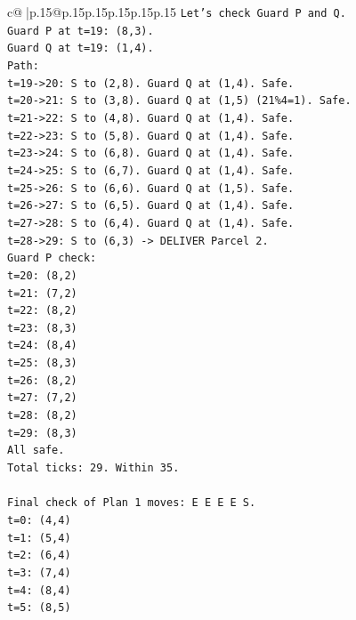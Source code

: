 \documentclass{article}
\begin{document}
{\begin{supertabular}{c@{$\;$}|p{.15\linewidth}@{}p{.15\linewidth}p{.15\linewidth}p{.15\linewidth}p{.15\linewidth}p{.15\linewidth}}
{{{\texttt{Let's check Guard P and Q.} \\
\texttt{Guard P at t=19: (8,3).} \\
\texttt{Guard Q at t=19: (1,4).} \\
\texttt{Path:} \\
\texttt{t=19{-}>20: S to (2,8). Guard Q at (1,4). Safe.} \\
\texttt{t=20{-}>21: S to (3,8). Guard Q at (1,5) (21\%4=1). Safe.} \\
\texttt{t=21{-}>22: S to (4,8). Guard Q at (1,4). Safe.} \\
\texttt{t=22{-}>23: S to (5,8). Guard Q at (1,4). Safe.} \\
\texttt{t=23{-}>24: S to (6,8). Guard Q at (1,4). Safe.} \\
\texttt{t=24{-}>25: S to (6,7). Guard Q at (1,4). Safe.} \\
\texttt{t=25{-}>26: S to (6,6). Guard Q at (1,5). Safe.} \\
\texttt{t=26{-}>27: S to (6,5). Guard Q at (1,4). Safe.} \\
\texttt{t=27{-}>28: S to (6,4). Guard Q at (1,4). Safe.} \\
\texttt{t=28{-}>29: S to (6,3) {-}> DELIVER Parcel 2.} \\
\texttt{Guard P check:} \\
\texttt{t=20: (8,2)} \\
\texttt{t=21: (7,2)} \\
\texttt{t=22: (8,2)} \\
\texttt{t=23: (8,3)} \\
\texttt{t=24: (8,4)} \\
\texttt{t=25: (8,3)} \\
\texttt{t=26: (8,2)} \\
\texttt{t=27: (7,2)} \\
\texttt{t=28: (8,2)} \\
\texttt{t=29: (8,3)} \\
\texttt{All safe.} \\
\texttt{Total ticks: 29. Within 35.} \\
\\ 
\texttt{Final check of Plan 1 moves: E E E E S.} \\
\texttt{t=0: (4,4)} \\
\texttt{t=1: (5,4)} \\
\texttt{t=2: (6,4)} \\
\texttt{t=3: (7,4)} \\
\texttt{t=4: (8,4)} \\
\texttt{t=5: (8,5)} \\
}}}
\end{supertabular}}
\end{document}
